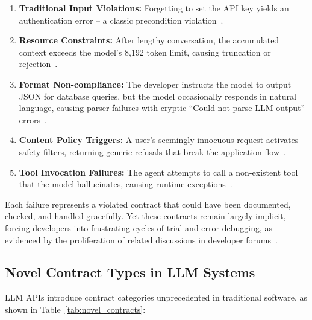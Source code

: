 \documentclass[11pt]{article}
\begin{document}
\begin{enumerate}
    \item \textbf{Traditional Input Violations:} Forgetting to set the API key yields an authentication error -- a classic precondition violation~\cite{stackoverflow76796341}.
    
    \item \textbf{Resource Constraints:} After lengthy conversation, the accumulated context exceeds the model's 8,192 token limit, causing truncation or rejection~\cite{githublangchain12264}.
    
    \item \textbf{Format Non-compliance:} The developer instructs the model to output JSON for database queries, but the model occasionally responds in natural language, causing parser failures with cryptic ``Could not parse LLM output'' errors~\cite{githublangchain22103}.
    
    \item \textbf{Content Policy Triggers:} A user's seemingly innocuous request activates safety filters, returning generic refusals that break the application flow~\cite{githubopenai331}.
    
    \item \textbf{Tool Invocation Failures:} The agent attempts to call a non-existent tool that the model hallucinates, causing runtime exceptions~\cite{githublangchain18279}.
\end{enumerate}

Each failure represents a violated contract that could have been documented, checked, and handled gracefully. Yet these contracts remain largely implicit, forcing developers into frustrating cycles of trial-and-error debugging, as evidenced by the proliferation of related discussions in developer forums~\cite{stackoverflow77606776, stackoverflow76553851}.

\subsection{Novel Contract Types in LLM Systems}

LLM APIs introduce contract categories unprecedented in traditional software, as shown in Table~\ref{tab:novel_contracts}:
\end{document}
